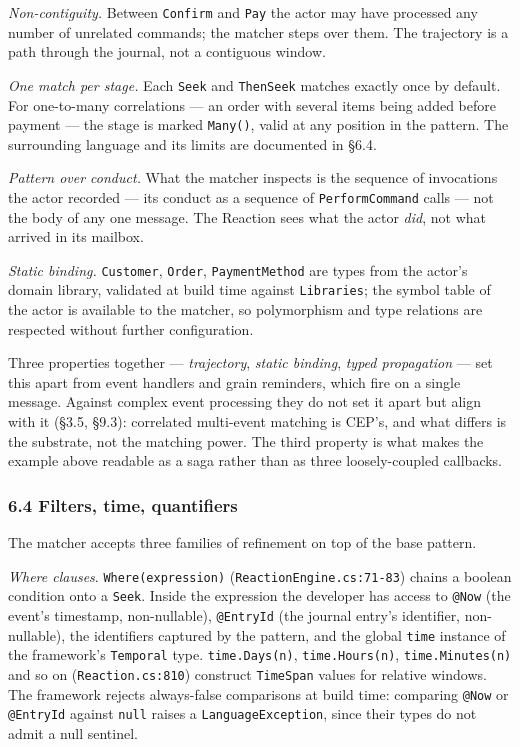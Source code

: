 \documentclass[
]{article}
\let\origtexttt\texttt%
\renewcommand{\texttt}[1]{\origtexttt{\seqsplit{#1}}}%
\let\texttt\origtexttt%
\begin{document}
\emph{Non-contiguity.} Between \texttt{Confirm} and \texttt{Pay} the
actor may have processed any number of unrelated commands; the matcher
steps over them. The trajectory is a path through the journal, not a
contiguous window.

\emph{One match per stage.} Each \texttt{Seek} and \texttt{ThenSeek}
matches exactly once by default. For one-to-many correlations --- an
order with several items being added before payment --- the stage is
marked \texttt{Many()}, valid at any position in the pattern. The
surrounding language and its limits are documented in §6.4.

\emph{Pattern over conduct.} What the matcher inspects is the sequence
of invocations the actor recorded --- its conduct as a sequence of
\texttt{PerformCommand} calls --- not the body of any one message. The
Reaction sees what the actor \emph{did}, not what arrived in its
mailbox.

\emph{Static binding.} \texttt{Customer}, \texttt{Order},
\texttt{PaymentMethod} are types from the actor's domain library,
validated at build time against \texttt{Libraries}; the symbol table of
the actor is available to the matcher, so polymorphism and type
relations are respected without further configuration.

Three properties together --- \emph{trajectory}, \emph{static binding},
\emph{typed propagation} --- set this apart from event handlers and
grain reminders, which fire on a single message. Against complex event
processing they do not set it apart but align with it (§3.5, §9.3):
correlated multi-event matching is CEP's, and what differs is the
substrate, not the matching power. The third property is what makes the
example above readable as a saga rather than as three loosely-coupled
callbacks.

\subsubsection{6.4 Filters, time,
quantifiers}\label{filters-time-quantifiers}

The matcher accepts three families of refinement on top of the base
pattern.

\emph{Where clauses}. \texttt{Where(expression)}
(\texttt{ReactionEngine.cs:71-83}) chains a boolean condition onto a
\texttt{Seek}. Inside the expression the developer has access to
\texttt{@Now} (the event's timestamp, non-nullable), \texttt{@EntryId}
(the journal entry's identifier, non-nullable), the identifiers captured
by the pattern, and the global \texttt{time} instance of the framework's
\texttt{Temporal} type. \texttt{time.Days(n)}, \texttt{time.Hours(n)},
\texttt{time.Minutes(n)} and so on (\texttt{Reaction.cs:810}) construct
\texttt{TimeSpan} values for relative windows. The framework rejects
always-false comparisons at build time: comparing \texttt{@Now} or
\texttt{@EntryId} against \texttt{null} raises a
\texttt{LanguageException}, since their types do not admit a null
sentinel.
\end{document}
